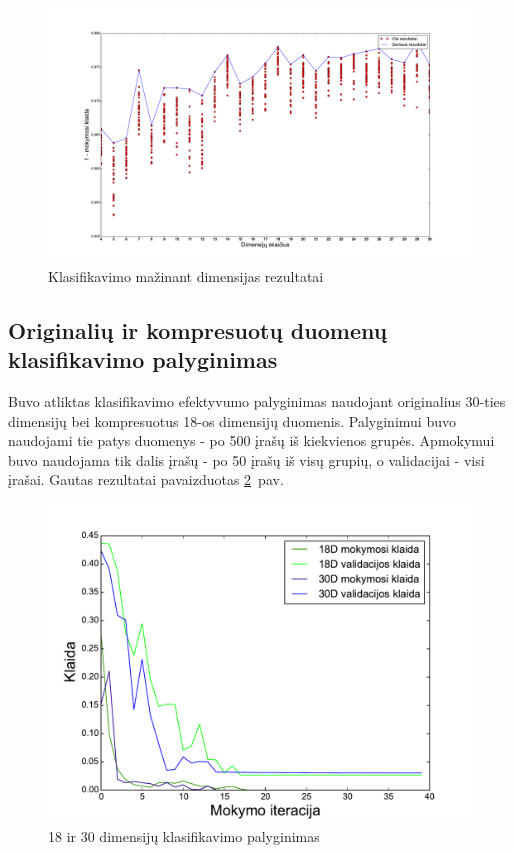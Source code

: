 \documentclass{VUMIFPSbakalaurinis}
\begin{document}
\begin{figure}
	\includegraphics[scale=0.32]{pics/dimensions_2015-5-27_6-18-5}
	\caption{Klasifikavimo mažinant dimensijas rezultatai}
	\label{fig:experiment-2}
\end{figure}


\subsection{Originalių ir kompresuotų duomenų klasifikavimo palyginimas}

Buvo atliktas klasifikavimo efektyvumo palyginimas naudojant originalius 30-ties dimensijų bei kompresuotus 18-os dimensijų duomenis.
Palyginimui buvo naudojami tie patys duomenys - po 500 įrašų iš kiekvienos grupės.
Apmokymui buvo naudojama tik dalis įrašų - po 50 įrašų iš visų grupių, o validacijai - visi įrašai.
Gautas rezultatai pavaizduotas \ref{fig:dim-comparisons}~pav.

\begin{figure}
	\includegraphics[scale=0.75]{pics/dim_comparisons_2015-5-27_14-21-13}
	\caption{18 ir 30 dimensijų klasifikavimo palyginimas}
	\label{fig:dim-comparisons}
\end{figure}
\end{document}
